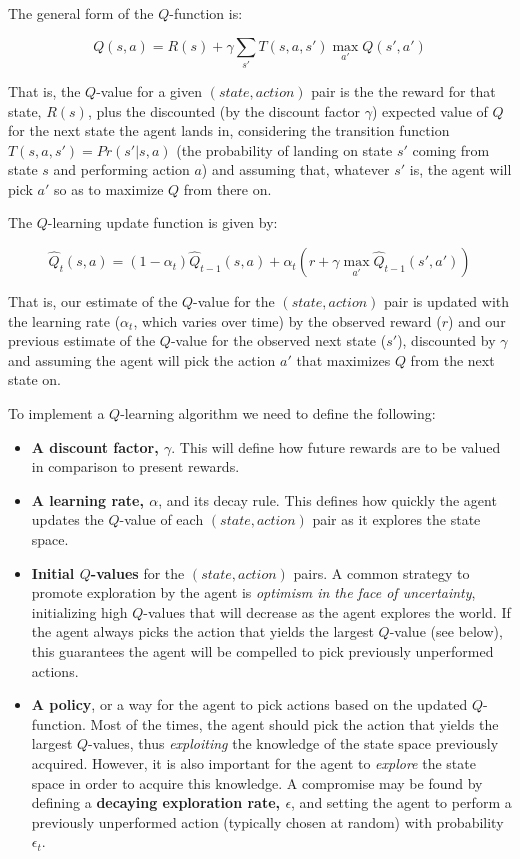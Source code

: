 \documentclass{article}
\begin{document}
The general form of the $Q$-function is:

\begin{equation}
Q(s, a) = R(s) + \gamma \sum_{s'}{T(s,a,s')}\max_{a'}{Q(s',a')}
\end{equation}

That is, the $Q$-value for a given $(state, action)$ pair is the the reward for that state, $R(s)$, plus the discounted (by the discount factor $\gamma$) expected value of $Q$ for the next state the agent lands in, considering the transition function $T(s,a,s') = Pr(s'|s,a)$ (the probability of landing on state $s'$ coming from state $s$ and performing action $a$) and assuming that, whatever $s'$ is, the agent will pick $a'$ so as to maximize $Q$ from there on.

The $Q$-learning update function is given by:

\begin{equation}
\label{eq:q-update}
\hat{Q}_t(s,a) = (1 - \alpha_t) \hat{Q}_{t-1}(s,a) + \alpha_t(r + \gamma \max_{a'}\hat{Q}_{t-1}(s',a'))
\end{equation}

That is, our estimate of the $Q$-value for the $(state, action)$ pair is updated with the learning rate ($\alpha_t$, which varies over time) by the observed reward ($r$) and our previous estimate of the $Q$-value for the observed next state ($s'$), discounted by $\gamma$ and assuming the agent will pick the action $a'$ that maximizes $Q$ from the next state on.

To implement a $Q$-learning algorithm we need to define the following:

\begin{itemize}
    \item \textbf{A discount factor, $\gamma$}. This will define how future rewards are to be valued in comparison to present rewards.
    \item \textbf{A learning rate, $\alpha$}, and its decay rule. This defines how quickly the agent updates the $Q$-value of each $(state, action)$ pair as it explores the state space.
    \item \textbf{Initial $Q$-values} for the $(state, action)$ pairs. A common strategy to promote exploration by the agent is \textit{optimism in the face of uncertainty}, initializing high $Q$-values that will decrease as the agent explores the world. If the agent always picks the action that yields the largest $Q$-value (see below), this guarantees the agent will be compelled to pick previously unperformed actions.
    \item \textbf{A policy}, or a way for the agent to pick actions based on the updated $Q$-function. Most of the times, the agent should pick the action that yields the largest $Q$-values, thus \textit{exploiting} the knowledge of the state space previously acquired. However, it is also important for the agent to \textit{explore} the state space in order to acquire this knowledge. A compromise may be found by defining a \textbf{decaying exploration rate, $\epsilon$}, and setting the agent to perform a previously unperformed action (typically chosen at random) with probability $\epsilon_t$.
\end{itemize}
\end{document}

